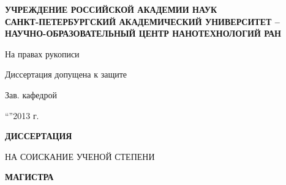 \initializefrontsections

\pagestyle{title}

\begin{center}
	{\bf \large УЧРЕЖДЕНИЕ РОССИЙСКОЙ АКАДЕМИИ НАУК \\
	САНКТ-ПЕТЕРБУРГСКИЙ АКАДЕМИЧЕСКИЙ   УНИВЕРСИТЕТ – НАУЧНО-ОБРАЗОВАТЕЛЬНЫЙ ЦЕНТР НАНОТЕХНОЛОГИЙ РАН}

	\vspace{0.5cm}

	\begin{minipage}[b]{0.5\linewidth}
    	\makebox[1cm]{}
	\end{minipage}
	\begin{minipage}[b]{0.45\linewidth}
    	\centering
	    \large На правах рукописи
    
    	\vspace{0.5cm}
    
	    Диссертация допущена к защите
	
    	Зав. кафедрой

	    \vspace{0.4cm}
    
    	\underline{\hspace*{2.5in}}

	    \vspace{0.3cm}
    	
	    ``\hspace*{0.25in}''\underline{\hspace*{1.4in}}2013 г.
	\end{minipage}

	\vspace{2cm}

	{\Large \bf ДИССЕРТАЦИЯ}

	\vspace{0.3cm}

	{\Large НА СОИСКАНИЕ УЧЕНОЙ СТЕПЕНИ}

	\vspace{0.3cm}

	{\Large \bf МАГИСТРА}

\end{center}


